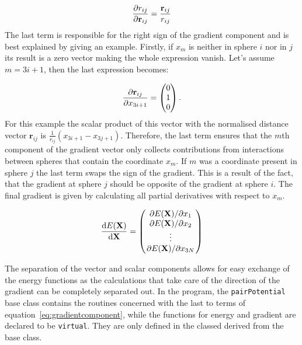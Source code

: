 \begin{align}
    \pdv{r_{ij}}{\mathbf{r}_{ij}}=\frac{\mathbf{r}_{ij}}{r_{ij}}
\end{align}%
%
The last term is responsible for the right sign of the gradient component and
is best explained by giving an example. Firstly, if $x_m$ is neither in sphere
$i$ nor in $j$ its result is a zero vector making the whole expression vanish.
Let's assume $m=3i+1$, then the last expression becomes:

\begin{align}
    \pdv{\mathbf{r}_{ij}}{x_{3i+1}}=
    \begin{pmatrix}
        0\\1\\0
    \end{pmatrix}.
\end{align}%
%
For this example the scalar product of this vector with the normalised distance
vector $\mathbf{r}_{ij}$ is $\frac{1}{r_{ij}}(x_{3i+1} - x_{3j+1})$. Therefore,
the last term ensures that the $m$th component of the gradient vector only
collects contributions from interactions between spheres that contain the
coordinate $x_m$. If $m$ was a coordinate present in sphere $j$ the last term
swaps the sign of the gradient. This is a result of the fact, that the gradient
at sphere $j$ should be opposite of the gradient at sphere $i$. The final
gradient is given by calculating all partial derivatives with respect to $x_m$.

\begin{align}
    \dv{E(\mathbf{X})}{\mathbf{X}}=
    \begin{pmatrix}
        \pdv*{E(\mathbf{X})}{x_1}\\
        \pdv*{E(\mathbf{X})}{x_2}\\
        \vdots\\
        \pdv*{E(\mathbf{X})}{x_{3N}}
    \end{pmatrix}
\end{align}

The separation of the vector and scalar components allows for easy exchange of
the energy functions as the calculations that take care of the direction of the
gradient can be completely separated out. In the program, the
\texttt{pairPotential} base class contains the routines concerned with the last
to terms of equation~\eqref{eq:gradientcomponent}, while the functions for
energy and gradient are declared to be \texttt{virtual}. They are only defined
in the classed derived from the base class.

